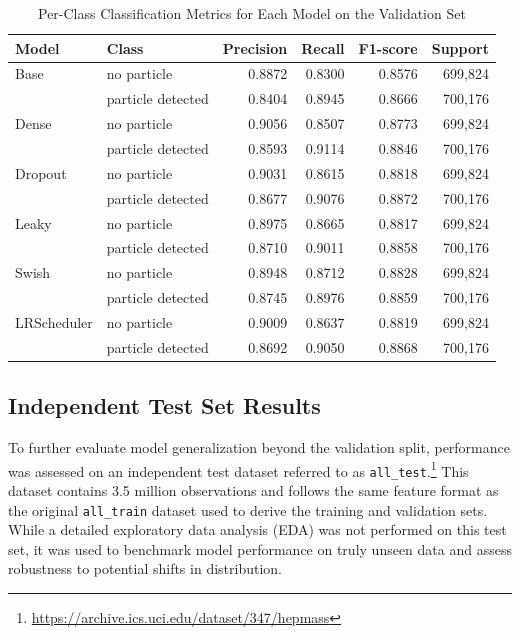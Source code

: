 \documentclass{article}      %
\begin{document}
\begin{table}[!htbp]
    \centering
    \caption{Per-Class Classification Metrics for Each Model on the Validation Set}
    \begin{tabular}{llrrrr}
    \arrayrulecolor{black}
    \toprule
    \textbf{Model} & \textbf{Class} & \textbf{Precision} & \textbf{Recall} & \textbf{F1-score} & \textbf{Support} \\
    \midrule
    Base & no particle         & 0.8872 & 0.8300 & 0.8576 & 699{,}824 \\
    & particle detected   & 0.8404 & 0.8945 & 0.8666 & 700{,}176 \\
    \midrule
    Dense & no particle         & 0.9056 & 0.8507 & 0.8773 & 699{,}824 \\
    & particle detected   & 0.8593 & 0.9114 & 0.8846 & 700{,}176 \\
    \midrule
    Dropout & no particle         & 0.9031 & 0.8615 & 0.8818 & 699{,}824 \\
    & particle detected   & 0.8677 & 0.9076 & 0.8872 & 700{,}176 \\
    \midrule
    Leaky & no particle         & 0.8975 & 0.8665 & 0.8817 & 699{,}824 \\
    & particle detected   & 0.8710 & 0.9011 & 0.8858 & 700{,}176 \\
    \midrule
    Swish & no particle         & 0.8948 & 0.8712 & 0.8828 & 699{,}824 \\
    & particle detected   & 0.8745 & 0.8976 & 0.8859 & 700{,}176 \\
    \midrule
    LRScheduler & no particle         & 0.9009 & 0.8637 & 0.8819 & 699{,}824 \\
    & particle detected   & 0.8692 & 0.9050 & 0.8868 & 700{,}176 \\
    \bottomrule
    \end{tabular}
    \label{table:metrics_by_class}
\end{table}

\subsection{Independent Test Set Results}

To further evaluate model generalization beyond the validation split, performance was assessed on an independent test dataset referred to as \texttt{all\_test}.\footnote{\url{https://archive.ics.uci.edu/dataset/347/hepmass}} This dataset contains 3.5 million observations and follows the same feature format as the original \texttt{all\_train} dataset used to derive the training and validation sets. While a detailed exploratory data analysis (EDA) was not performed on this test set, it was used to benchmark model performance on truly unseen data and assess robustness to potential shifts in distribution.
\end{document}
